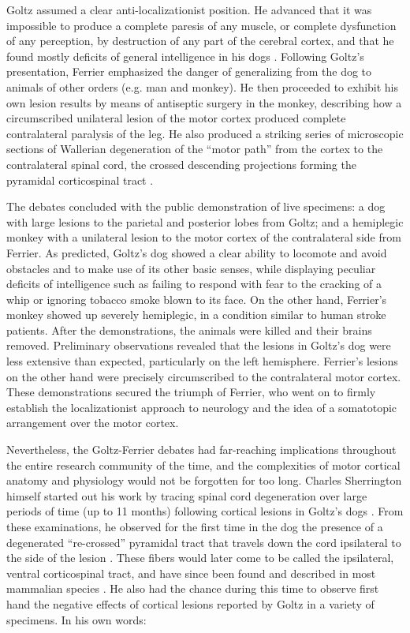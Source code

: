 Goltz assumed a clear anti-localizationist position. He advanced that it was impossible to produce a complete paresis of any muscle, or complete dysfunction of any perception, by destruction of any part of the cerebral cortex, and that he found mostly deficits of general intelligence in his dogs \cite{Tyler2000}. Following Goltz's presentation, Ferrier emphasized the danger of generalizing from the dog to animals of other orders (e.g. man and monkey). He then proceeded to exhibit his own lesion results by means of antiseptic surgery in the monkey, describing how a circumscribed unilateral lesion of the motor cortex produced complete contralateral paralysis of the leg. He also produced a striking series of microscopic sections of Wallerian degeneration \cite{Waller1850} of the ``motor path'' from the cortex to the contralateral spinal cord, the crossed descending projections forming the pyramidal corticospinal tract \cite{Tyler2000}.

The debates concluded with the public demonstration of live specimens: a dog with large lesions to the parietal and posterior lobes from Goltz; and a hemiplegic monkey with a unilateral lesion to the motor cortex of the contralateral side from Ferrier. As predicted, Goltz's dog showed a clear ability to locomote and avoid obstacles and to make use of its other basic senses, while displaying peculiar deficits of intelligence such as failing to respond with fear to the cracking of a whip or ignoring tobacco smoke blown to its face. On the other hand, Ferrier's monkey showed up severely hemiplegic, in a condition similar to human stroke patients. After the demonstrations, the animals were killed and their brains removed. Preliminary observations revealed that the lesions in Goltz's dog were less extensive than expected, particularly on the left hemisphere. Ferrier's lesions on the other hand were precisely circumscribed to the contralateral motor cortex. These demonstrations secured the triumph of Ferrier, who went on to firmly establish the localizationist approach to neurology and the idea of a somatotopic arrangement over the motor cortex.

Nevertheless, the Goltz-Ferrier debates had far-reaching implications throughout the entire research community of the time, and the complexities of motor cortical anatomy and physiology would not be forgotten for too long. Charles Sherrington himself started out his work by tracing spinal cord degeneration over large periods of time (up to 11 months) following cortical lesions in Goltz's dogs \cite{Langley1884,Sherrington1885}. From these examinations, he observed for the first time in the dog the presence of a degenerated ``re-crossed'' pyramidal tract that travels down the cord ipsilateral to the side of the lesion \cite{Sherrington1885}. These fibers would later come to be called the ipsilateral, ventral corticospinal tract, and have since been found and described in most mammalian species \cite{Kuypers1981,Brosamle2000,Lacroix2004}. He also had the chance during this time to observe first hand the negative effects of cortical lesions reported by Goltz in a variety of specimens. In his own words:

